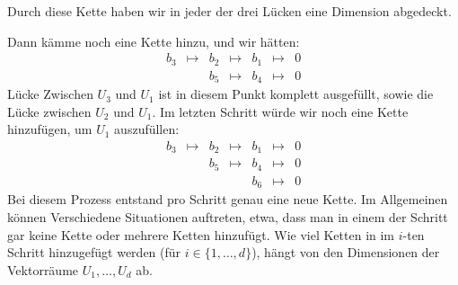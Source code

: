 \begin{bsp}
	Durch diese Kette haben wir in jeder der drei Lücken eine Dimension abgedeckt. 
	
	Dann kämme noch eine Kette hinzu, und wir hätten:  
	\begin{equation*}
		\begin{array}{ccccccc}
			b_3 & \mapsto & b_2 & \mapsto & b_1 & \mapsto & 0
			\\ && b_5 & \mapsto & b_4 & \mapsto & 0
		\end{array}
	\end{equation*}
	Lücke Zwischen $U_3$ und $U_1$ ist in diesem Punkt komplett ausgefüllt, sowie die Lücke zwischen $U_2$ und $U_1$. Im letzten Schritt würde wir noch eine Kette hinzufügen, um $U_1$ auszufüllen:
	\begin{equation*}
		\begin{array}{ccccccc}
			b_3 & \mapsto & b_2 & \mapsto & b_1 & \mapsto & 0
			\\ && b_5 & \mapsto & b_4 & \mapsto & 0
			\\ && & & b_6 & \mapsto & 0
		\end{array}
	\end{equation*}
	Bei diesem Prozess entstand pro Schritt genau eine neue Kette. Im Allgemeinen können Verschiedene Situationen auftreten, etwa, dass man in einem der Schritt gar keine Kette oder mehrere Ketten hinzufügt. Wie viel Ketten in im $i$-ten Schritt hinzugefügt werden (für $i \in \{1,\ldots,d\}$), hängt von den Dimensionen der Vektorräume $U_1,\ldots,U_d$ ab. 
\end{bsp}


